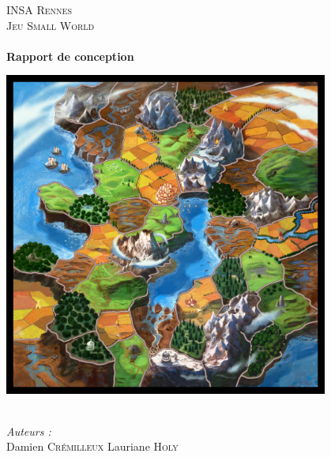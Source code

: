 \begin{titlepage}
\begin{center}


\textsc{\LARGE INSA Rennes}\\[1.5cm]

\textsc{\Large Jeu Small World}\\[0.5cm]

\HRule \\[0.4cm]
{ \huge \bfseries Rapport de conception \\[0.4cm] }

\includegraphics[width=0.8\textwidth]{./images/plateau_smallworld.jpg}~\\[1cm]


\HRule \\[1.5cm]

\begin{minipage}{0.4\textwidth}
\begin{flushleft} \large
\emph{Auteurs :}\\
Damien \textsc{Crémilleux}
Lauriane \textsc{Holy}
\end{flushleft}
\end{minipage}

\vfill

\end{center}
\end{titlepage}